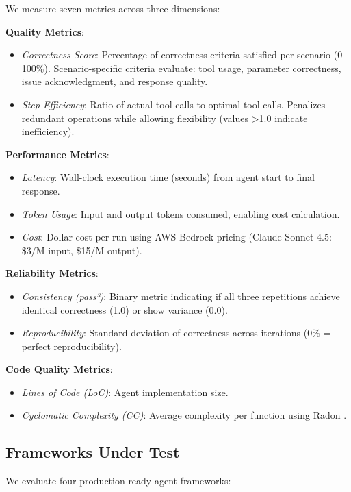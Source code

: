 \documentclass[sigconf,nonacm]{acmart}
\begin{document}
We measure seven metrics across three dimensions:

\textbf{Quality Metrics}:
\begin{itemize}
\item \textit{Correctness Score}: Percentage of correctness criteria satisfied per scenario (0-100\%). Scenario-specific criteria evaluate: tool usage, parameter correctness, issue acknowledgment, and response quality.
\item \textit{Step Efficiency}: Ratio of actual tool calls to optimal tool calls. Penalizes redundant operations while allowing flexibility (values >1.0 indicate inefficiency).
\end{itemize}

\textbf{Performance Metrics}:
\begin{itemize}
\item \textit{Latency}: Wall-clock execution time (seconds) from agent start to final response.
\item \textit{Token Usage}: Input and output tokens consumed, enabling cost calculation.
\item \textit{Cost}: Dollar cost per run using AWS Bedrock pricing (Claude Sonnet 4.5: \$3/M input, \$15/M output).
\end{itemize}

\textbf{Reliability Metrics}:
\begin{itemize}
\item \textit{Consistency (pass³)}: Binary metric indicating if all three repetitions achieve identical correctness (1.0) or show variance (0.0).
\item \textit{Reproducibility}: Standard deviation of correctness across iterations (0\% = perfect reproducibility).
\end{itemize}

\textbf{Code Quality Metrics}:
\begin{itemize}
\item \textit{Lines of Code (LoC)}: Agent implementation size.
\item \textit{Cyclomatic Complexity (CC)}: Average complexity per function using Radon \cite{radon2023}.
\end{itemize}

\subsection{Frameworks Under Test}

We evaluate four production-ready agent frameworks:
\end{document}
